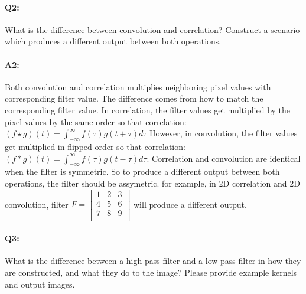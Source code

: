 	\pagebreak
	\paragraph{Q2:} What is the difference between convolution and correlation? Construct a scenario which produces a different output between both operations.
	
	
	\paragraph{A2:} Both convolution and correlation multiplies neighboring pixel values with corresponding filter value. The difference comes from how to match the corresponding filter value. In correlation, the filter values get multiplied by the pixel values by the same order so that correlation: $(f\star g)(t) = \int_{-\infty}^{\infty}f(\tau)g(t+\tau)d\tau$ However, in convolution, the filter values get multiplied in flipped order so that correlation: $(f\ast g)(t) = \int_{-\infty}^{\infty}f(\tau)g(t-\tau)d\tau$. Correlation and convolution are identical when the filter is symmetric. So to produce a different output between both operations, the filter should be assymetric. for example, in 2D correlation and 2D convolution, filter
	$F = \left[
	\begin{array}{ccc}
		1 & 2 & 3 \\
		4 & 5 & 6 \\
		7 & 8 & 9 \\
	\end{array}
	\right]
	$
will produce a different output. 
	
	
	
	
	\pagebreak
		\paragraph{Q3:} What is the difference between a high pass filter and a low pass filter in how they are constructed, and what they do to the image? Please provide example kernels and output images.
	
